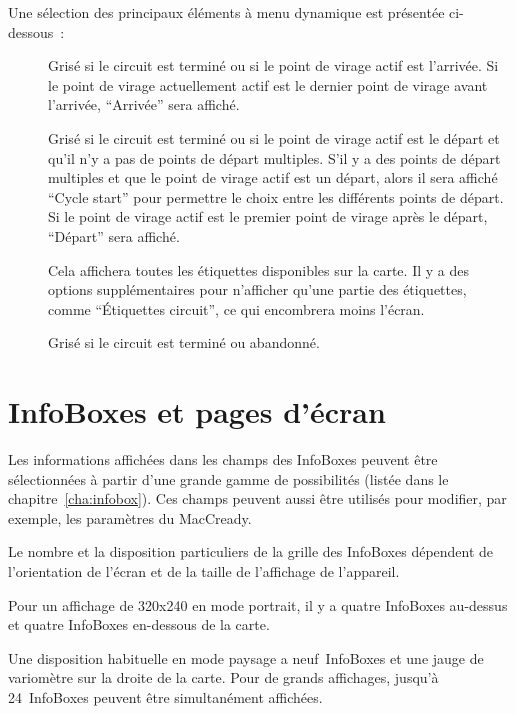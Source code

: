 Une sélection des principaux éléments à menu dynamique est présentée ci-dessous~:
\begin{description}
\item[]  
  Grisé si le circuit est terminé ou si le point de virage actif est
  l'arrivée. Si le point de virage actuellement actif est le dernier point de virage avant
  l'arrivée, ``Arrivée'' sera affiché.
\item[]  
  Grisé si le circuit est terminé ou si le point de virage actif est le
  départ et qu'il n'y a pas de points de départ multiples. S'il y a des points de départ
  multiples et que le point de virage actif est un départ, alors il sera
  affiché ``Cycle start'' pour permettre le choix entre les différents
  points de départ. Si le point de virage actif est le premier point de virage après
  le départ, ``Départ'' sera affiché.
\item[] 
  Cela affichera toutes les étiquettes disponibles sur la carte. Il y a des options supplémentaires pour
  n'afficher qu'une partie des étiquettes, comme ``Étiquettes circuit'', ce qui encombrera moins l'écran.
\item[]  
  Grisé si le circuit est terminé ou abandonné.
\end{description}


\section{InfoBoxes et pages d'écran}\label{sec:infoboxandpages}

Les informations affichées dans les champs des InfoBoxes peuvent être sélectionnées à partir
d'une grande gamme de possibilités (listée dans le chapitre~\ref{cha:infobox}). Ces
champs peuvent aussi être utilisés pour modifier, par exemple, les paramètres du MacCready.

Le nombre et la disposition particuliers de la grille des InfoBoxes dépendent de
l'orientation de l'écran et de la taille de l'affichage de l'appareil.

Pour un affichage de 320x240 en mode portrait, il y a quatre InfoBoxes au-dessus et quatre
InfoBoxes en-dessous de la carte.

Une disposition habituelle en mode paysage a neuf~InfoBoxes et une jauge de variomètre sur la droite de la carte.
Pour de grands affichages, jusqu'à 24~InfoBoxes peuvent être simultanément affichées.  

